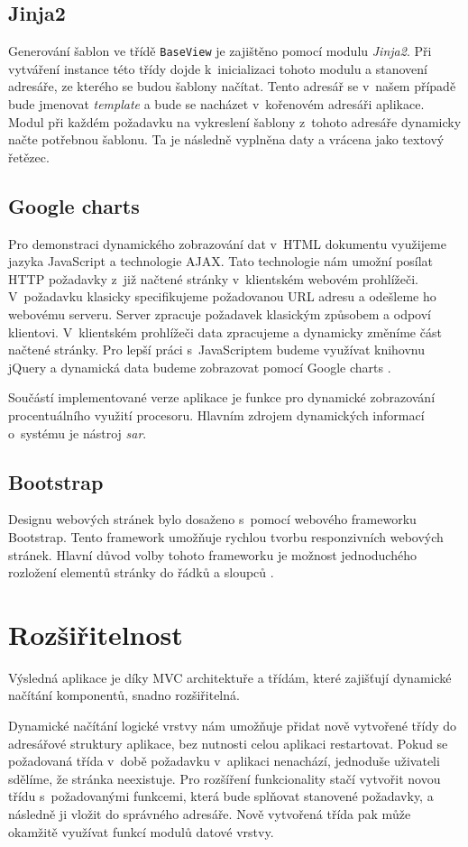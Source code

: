     \subsection{Jinja2}
    Generování šablon ve třídě \verb|BaseView| je zajištěno pomocí modulu \emph{Jinja2}. Při vytváření instance této třídy dojde k~inicializaci tohoto modulu a stanovení adresáře, ze kterého se budou šablony načítat. Tento adresář se v~našem případě bude jmenovat \emph{template} a bude se nacházet v~kořenovém adresáři aplikace. Modul při každém požadavku na vykreslení šablony z~tohoto adresáře dynamicky načte potřebnou šablonu. Ta je následně vyplněna daty a vrácena jako textový řetězec.
    \subsection{Google charts}
    Pro demonstraci dynamického zobrazování dat v~HTML dokumentu využijeme jazyka JavaScript a technologie AJAX. Tato technologie nám umožní posílat HTTP požadavky z~již načtené stránky v~klientském webovém prohlížeči. V~požadavku klasicky specifikujeme požadovanou URL adresu a odešleme ho webovému serveru. Server zpracuje požadavek klasickým způsobem a odpoví klientovi. V~klientském prohlížeči data zpracujeme a dynamicky změníme část načtené stránky. Pro lepší práci s~JavaScriptem budeme využívat knihovnu jQuery \cite{jquery} a dynamická data budeme zobrazovat pomocí Google charts \cite{google}.

    Součástí implementované verze aplikace je funkce pro dynamické zobrazování procentuálního využití procesoru. Hlavním zdrojem dynamických informací o~systému je nástroj \emph{sar}.
    \subsection{Bootstrap}
    Designu webových stránek bylo dosaženo s~pomocí webového frameworku Bootstrap. Tento framework umožňuje rychlou tvorbu responzivních webových stránek. Hlavní důvod volby tohoto frameworku je možnost jednoduchého rozložení elementů stránky do řádků a sloupců \cite{bootstrap}.


\section{Rozšiřitelnost}
Výsledná aplikace je díky MVC architektuře a třídám, které zajišťují dynamické načítání komponentů, snadno rozšiřitelná.

Dynamické načítání logické vrstvy nám umožňuje přidat nově vytvořené třídy do adresářové struktury aplikace, bez nutnosti celou aplikaci restartovat. Pokud se požadovaná třída v~době požadavku v~aplikaci nenachází, jednoduše uživateli sdělíme, že stránka neexistuje. Pro rozšíření funkcionality stačí vytvořit novou třídu s~požadovanými funkcemi, která bude splňovat stanovené požadavky, a následně ji vložit do správného adresáře. Nově vytvořená třída pak může okamžitě využívat funkcí modulů datové vrstvy.

